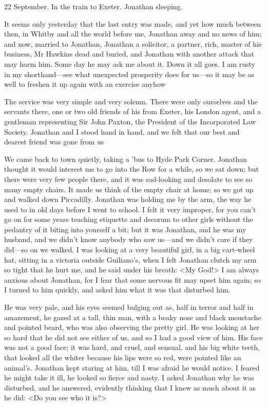 \begin{diary}{22 September.}
In the train to Exeter. Jonathan sleeping.

It seems only yesterday that the last entry was made, and yet how much between then, in Whitby and all the world before me, Jonathan away and no news of him; and now, married to Jonathan, Jonathan a solicitor, a partner, rich, master of his business, Mr Hawkins dead and buried, and Jonathan with another attack that may harm him. Some day he may ask me about it. Down it all goes. I am rusty in my shorthand—see what unexpected prosperity does for us—so it may be as well to freshen it up again with an exercise anyhow

The service was very simple and very solemn. There were only ourselves and the servants there, one or two old friends of his from Exeter, his London agent, and a gentleman representing Sir John Paxton, the President of the Incorporated Law Society. Jonathan and I stood hand in hand, and we felt that our best and dearest friend was gone from us

We came back to town quietly, taking a 'bus to Hyde Park Corner. Jonathan thought it would interest me to go into the Row for a while, so we sat down; but there were very few people there, and it was sad-looking and desolate to see so many empty chairs. It made us think of the empty chair at home; so we got up and walked down Piccadilly. Jonathan was holding me by the arm, the way he used to in old days before I went to school. I felt it very improper, for you can't go on for some years teaching etiquette and decorum to other girls without the pedantry of it biting into yourself a bit; but it was Jonathan, and he was my husband, and we didn't know anybody who saw us—and we didn't care if they did—so on we walked. I was looking at a very beautiful girl, in a big cart-wheel hat, sitting in a victoria outside Guiliano's, when I felt Jonathan clutch my arm so tight that he hurt me, and he said under his breath: <My God!> I am always anxious about Jonathan, for I fear that some nervous fit may upset him again; so I turned to him quickly, and asked him what it was that disturbed him.

He was very pale, and his eyes seemed bulging out as, half in terror and half in amazement, he gazed at a tall, thin man, with a beaky nose and black moustache and pointed beard, who was also observing the pretty girl. He was looking at her so hard that he did not see either of us, and so I had a good view of him. His face was not a good face; it was hard, and cruel, and sensual, and his big white teeth, that looked all the whiter because his lips were so red, were pointed like an animal's. Jonathan kept staring at him, till I was afraid he would notice. I feared he might take it ill, he looked so fierce and nasty. I asked Jonathan why he was disturbed, and he answered, evidently thinking that I knew as much about it as he did: <Do you see who it is?>


\end{diary}
